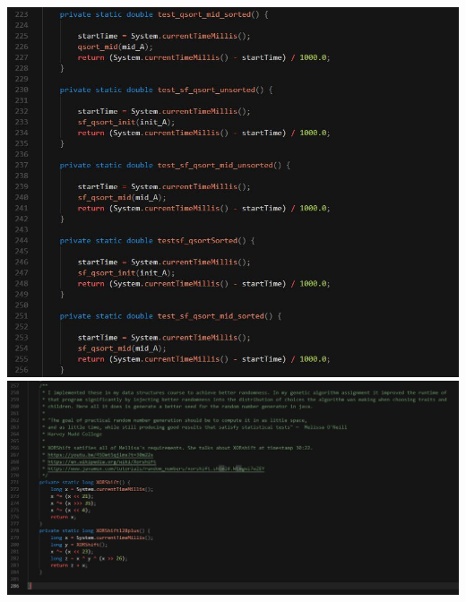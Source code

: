 \documentclass[paper=a4,fontsize=11pt]{article}
\begin{document}
\includegraphics[width=\linewidth]{code7.jpg}
\newpage
\includegraphics[width=\linewidth]{code8.jpg}
\newpage
\end{document}
